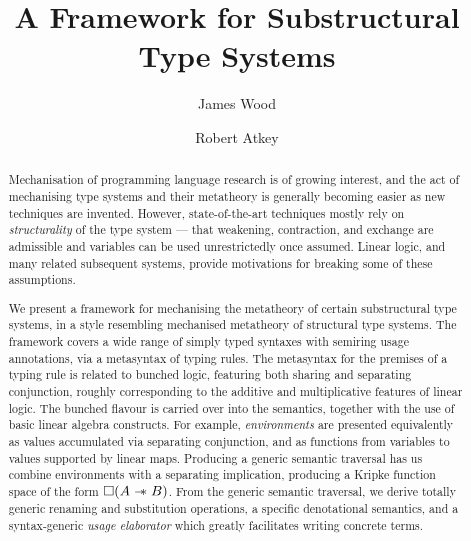\documentclass[sigplan,10pt,anonymous,review]{acmart}
\begin{document}
\title{A Framework for Substructural Type Systems}

\author{James Wood}

\author{Robert Atkey}


\begin{abstract}
  Mechanisation of programming language research is of growing interest, and
  the act of mechanising type systems and their metatheory is generally becoming
  easier as new techniques are invented.
  However, state-of-the-art techniques mostly rely on \emph{structurality} of
  the type system --- that weakening, contraction, and exchange are admissible
  and variables can be used unrestrictedly once assumed.
  Linear logic, and many related subsequent systems, provide motivations for
  breaking some of these assumptions.

  We present a framework for mechanising the metatheory of certain
  substructural type systems, in a style resembling mechanised metatheory of
  structural type systems.
  The framework covers a wide range of simply typed syntaxes with semiring
  usage annotations, via a metasyntax of typing rules.
  The metasyntax for the premises of a typing rule is related to bunched logic,
  featuring both sharing and separating conjunction, roughly corresponding to
  the additive and multiplicative features of linear logic.
  The bunched flavour is carried over into the semantics, together with the use
  of basic linear algebra constructs.
  For example, \emph{environments} are presented equivalently as values
  accumulated via separating conjunction, and as functions from variables to
  values supported by linear maps.
  Producing a generic semantic traversal has us combine environments with a
  separating implication, producing a Kripke function space of the form
  $\Box(A \mathrel{\mathord{-}\hspace{-0.75ex}*} B)$.
  From the generic semantic traversal, we derive totally generic renaming and
  substitution operations, a specific denotational semantics, and a
  syntax-generic \emph{usage elaborator} which greatly facilitates writing
  concrete terms.
\end{abstract}

\maketitle
\end{document}

